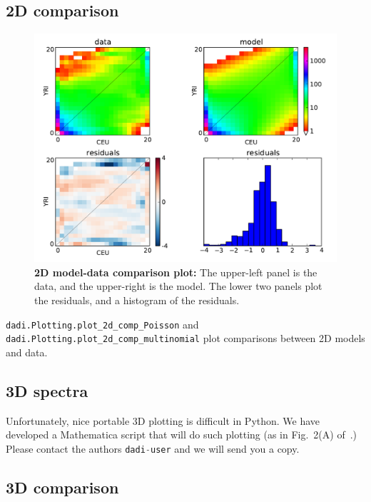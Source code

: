 \documentclass[12pt]{article}
\makeatletter
\newcommand{\py}[1]{\lstinline[language=Python, showstringspaces=False]@#1@}
\makeatother
\begin{document}
\subsection{2D comparison}

\begin{figure}
\centering
\includegraphics[scale=0.5]{2d_comp}
\caption{\textbf{2D model-data comparison plot:} The upper-left panel is the data, and the upper-right is the model. The lower two panels plot the residuals, and a histogram of the residuals.\label{fig:2d_comp}}
\end{figure}

\py{dadi.Plotting.plot_2d_comp_Poisson} and \py{dadi.Plotting.plot_2d_comp_multinomial} plot comparisons between 2D models and data.

\subsection{3D spectra}

Unfortunately, nice portable 3D plotting is difficult in Python.
We have developed a Mathematica script that will do such plotting (as in Fig.~2(A) of~\cite{bib:Gutenkunst2009}.)
Please contact the authors \py{dadi-user} and we will send you a copy.

\subsection{3D comparison}
\end{document}

